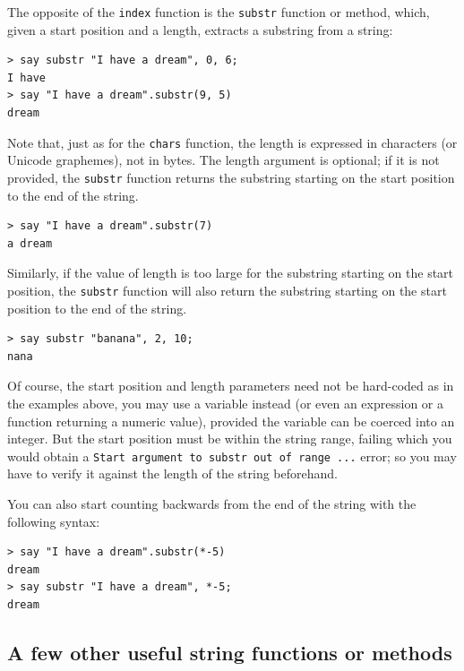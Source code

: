 The opposite of the {\tt index} function is the {\tt substr} 
function or method, which, given a start position and a length, 
extracts a substring from a string:

\begin{verbatim}
> say substr "I have a dream", 0, 6;
I have
> say "I have a dream".substr(9, 5)
dream
\end{verbatim}
%

Note that, just as for the {\tt chars} function, the length 
is expressed in characters (or Unicode graphemes), not in bytes. The 
length argument is optional; if it is not provided, the {\tt substr} function returns the substring starting on the start 
position to the end of the string. 

\begin{verbatim}
> say "I have a dream".substr(7)
a dream
\end{verbatim}

Similarly, if the value of length is too large for the 
substring starting on the start position, the {\tt substr} 
function will also return the substring starting on the start 
position to the end of the string.

\begin{verbatim}
> say substr "banana", 2, 10;
nana
\end{verbatim}

Of course, the start position and length parameters need not be 
hard-coded as in the examples above, you may use a variable 
instead (or even an expression or a function returning a numeric 
value), provided the variable can be coerced into an integer. 
But the start position must be within the string range, 
failing which you would obtain a {\tt Start argument to 
substr out of range ...} error; so 
you may have to verify it against the length of the string 
beforehand.

You can also start counting backwards from the end of the 
string with the following syntax:

\begin{verbatim}
> say "I have a dream".substr(*-5)
dream
> say substr "I have a dream", *-5;
dream
\end{verbatim}
%


\subsection{A few other useful string functions or methods}

